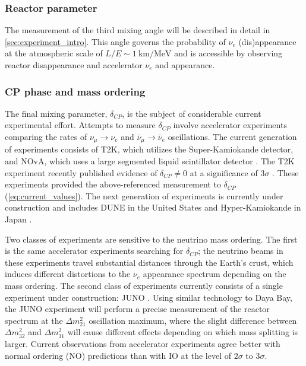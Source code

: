 \subsubsection{Reactor parameter}
The measurement of the third mixing angle \thetaot{}
will be described in detail in \cref{sec:experiment_intro}.
This angle
governs the probability of $\nu_e$ (dis)appearance
at the atmospheric scale of $L/E \sim \SI{1}{\km\per\MeV}$
and is accessible by observing reactor \nuebar{} disappearance
and accelerator $\nu_e$ and \nuebar{} appearance.

\subsubsection{CP phase and mass ordering}
The final mixing parameter, $\delta_{CP}$,
is the subject of considerable current experimental effort.
Attempts to measure $\delta_{CP}$ involve
accelerator experiments comparing the rates of
$\nu_\mu\to\nu_e$ and $\bar{\nu}_\mu\to\bar{\nu}_e$ oscillations.
The current generation of experiments consists of
T2K, which utilizes the Super-Kamiokande detector,
and NOvA,
which uses a large segmented liquid scintillator detector \cite{nova_deltacp}.
The T2K experiment recently published evidence of $\delta_{CP}\neq 0$
at a significance of $3\sigma$ \cite{t2k_deltacp}.
These experiments provided the above-referenced measurement to $\delta_{CP}$
(\cref{eq:current_values}).
The next generation of experiments is currently under construction
and includes DUNE in the United States \cite{dune_potential}
and Hyper-Kamiokande in Japan \cite{hyperk2015}.

Two classes of experiments are sensitive to the neutrino mass ordering.
The first is the same accelerator experiments searching for $\delta_{CP}$;
the neutrino beams in these experiments travel substantial distances
through the Earth's crust,
which induces different distortions to the $\nu_e$ appearance spectrum
depending on the mass ordering.
The second class of experiments currently consists of
a single experiment under construction: JUNO \cite{junoproposal2016}.
Using similar technology to Daya Bay,
the JUNO experiment will perform a precise measurement
of the reactor \nuebar{} spectrum
at the $\Delta m^2_{21}$ oscillation maximum,
where the slight difference between
$\Delta m^2_{32}$ and $\Delta m^2_{31}$
will cause different effects depending
on which mass splitting is larger.
Current observations from accelerator experiments
agree better with normal ordering (NO)
predictions than with IO at the level of $2\sigma$ to $3\sigma$.

